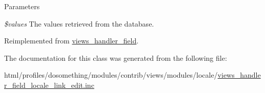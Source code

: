 \begin{DoxyParams}{Parameters}
\item[{\em \$values}]The values retrieved from the database. \end{DoxyParams}


Reimplemented from \hyperlink{classviews__handler__field_a82ff951c5e9ceb97b2eab86f880cbc1e}{views\_\-handler\_\-field}.

The documentation for this class was generated from the following file:\begin{DoxyCompactItemize}
\item 
html/profiles/dosomething/modules/contrib/views/modules/locale/\hyperlink{views__handler__field__locale__link__edit_8inc}{views\_\-handler\_\-field\_\-locale\_\-link\_\-edit.inc}\end{DoxyCompactItemize}

